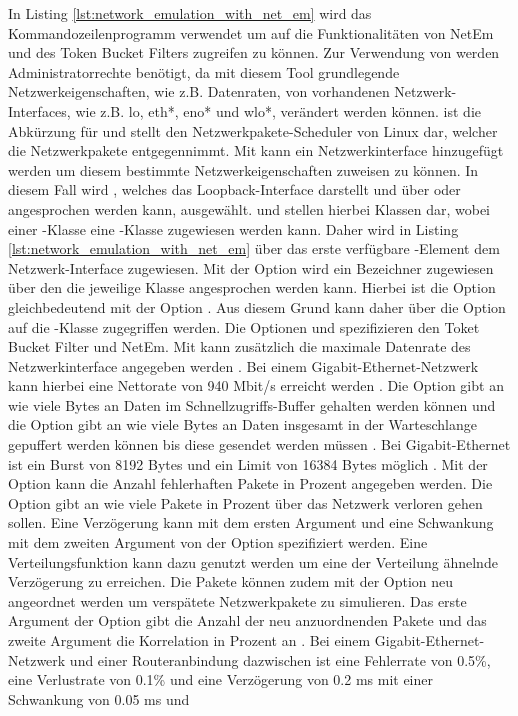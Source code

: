 In Listing \ref{lst:network_emulation_with_net_em} wird das Kommandozeilenprogramm  verwendet um auf die Funktionalitäten von NetEm und des Token Bucket Filters zugreifen zu können. Zur Verwendung von  werden Administratorrechte benötigt, da mit diesem Tool grundlegende Netzwerkeigenschaften, wie z.B. Datenraten, von vorhandenen Netzwerk-Interfaces, wie z.B. lo, eth*, eno* und wlo*, verändert werden können.  ist die Abkürzung für  und stellt den Netzwerkpakete-Scheduler von Linux dar, welcher die Netzwerkpakete entgegennimmt. Mit  kann ein Netzwerkinterface hinzugefügt werden um diesem bestimmte Netzwerkeigenschaften zuweisen zu können. In diesem Fall wird , welches das Loopback-Interface darstellt und über  oder  angesprochen werden kann, ausgewählt.  und  stellen hierbei Klassen dar, wobei einer -Klasse eine -Klasse zugewiesen werden kann. Daher wird in Listing \ref{lst:network_emulation_with_net_em} über  das erste verfügbare -Element dem Netzwerk-Interface zugewiesen. Mit der Option  wird ein Bezeichner zugewiesen über den die jeweilige Klasse angesprochen werden kann. Hierbei ist die Option  gleichbedeutend mit der Option . Aus diesem Grund kann daher über die Option  auf die -Klasse zugegriffen werden. Die Optionen  und  spezifizieren den Toket Bucket Filter und NetEm. Mit  kann zusätzlich die maximale Datenrate des Netzwerkinterface angegeben werden \cite{tc_net_em_nodate}. Bei einem Gigabit-Ethernet-Netzwerk kann hierbei eine Nettorate von 940 Mbit/s erreicht werden \cite{datendurchsatz_2020}. Die Option  gibt an wie viele Bytes an Daten im Schnellzugriffs-Buffer gehalten werden können und die Option  gibt an wie viele Bytes an Daten insgesamt in der Warteschlange gepuffert werden können bis diese gesendet werden müssen \cite{tc_net_em_nodate}. Bei Gigabit-Ethernet ist ein Burst von 8192 Bytes und ein Limit von 16384 Bytes möglich \cite{dembowski_lokale_2007}. Mit der Option  kann die Anzahl fehlerhaften Pakete in Prozent angegeben werden. Die Option  gibt an wie viele Pakete in Prozent über das Netzwerk verloren gehen sollen. Eine Verzögerung kann mit dem ersten Argument und eine Schwankung mit dem zweiten Argument von der Option  spezifiziert werden. Eine Verteilungsfunktion kann dazu genutzt werden um eine der Verteilung ähnelnde Verzögerung zu erreichen. Die Pakete können zudem mit der Option  neu angeordnet werden um verspätete Netzwerkpakete zu simulieren. Das erste Argument der Option  gibt die Anzahl der neu anzuordnenden Pakete und das zweite Argument die Korrelation in Prozent an \cite{tbf_token_bucket_filter_nodate}. Bei einem Gigabit-Ethernet-Netzwerk und einer Routeranbindung dazwischen ist eine Fehlerrate von \num{0,5}\%, eine Verlustrate von \num{0,1}\% und eine Verzögerung von \num{0,2} ms mit einer Schwankung von \num{0,05} ms und 